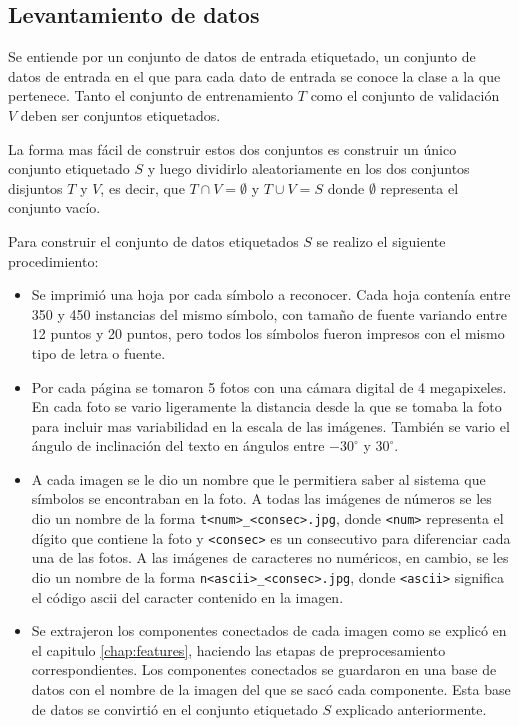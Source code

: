 \documentclass[a4paper, 11pt, oneside]{report}
\begin{document}
\subsection{Levantamiento de datos}

Se entiende por un conjunto de datos de entrada etiquetado, un conjunto de datos de entrada en el que para cada dato de entrada se conoce la clase a la que pertenece. Tanto el conjunto de entrenamiento $T$ como el conjunto de validación $V$ deben ser conjuntos etiquetados.

La forma mas fácil de construir estos dos conjuntos es construir un único conjunto etiquetado $S$ y luego dividirlo aleatoriamente en los dos conjuntos disjuntos $T$ y $V$, es decir, que $T \cap V = \emptyset$ y $T \cup V = S$ donde $\emptyset$ representa el conjunto vacío.

Para construir el conjunto de datos etiquetados $S$ se realizo el siguiente procedimiento:

\begin{itemize}

	\item Se imprimió una hoja por cada símbolo a reconocer. Cada hoja contenía entre 350 y 450 instancias del mismo símbolo, con tamaño de fuente variando entre 12 puntos y 20 puntos, pero todos los símbolos fueron impresos con el mismo tipo de letra o fuente.

	\item Por cada página se tomaron 5 fotos con una cámara digital de 4 megapixeles. En cada foto se vario ligeramente la distancia desde la que se tomaba la foto para incluir mas variabilidad en la escala de las imágenes. También se vario el ángulo de inclinación del texto en ángulos entre $-30^\circ$ y $30^\circ$.

	\item A cada imagen se le dio un nombre que le permitiera saber al sistema que símbolos se encontraban en la foto. A todas las imágenes de números se les dio un nombre de la forma \verb/t<num>_<consec>.jpg/, donde \verb/<num>/ representa el dígito que contiene la foto y \verb/<consec>/ es un consecutivo para diferenciar cada una de las fotos. A las imágenes de caracteres no numéricos, en cambio, se les dio un nombre de la forma \verb/n<ascii>_<consec>.jpg/, donde \verb/<ascii>/ significa el código ascii del caracter contenido en la imagen.

	\item Se extrajeron los componentes conectados de cada imagen como se explicó en el capitulo \ref{chap:features}, haciendo las etapas de preprocesamiento correspondientes. Los componentes conectados se guardaron en una base de datos con el nombre de la imagen del que se sacó cada componente. Esta base de datos se convirtió en el conjunto etiquetado $S$ explicado anteriormente.

\end{itemize}
\end{document}
